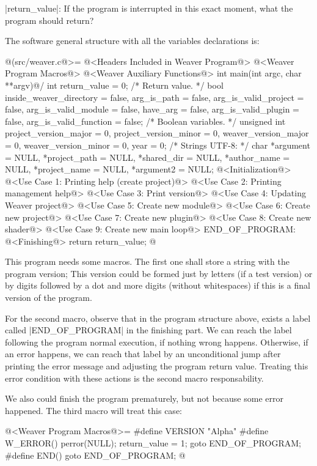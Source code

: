 |return_value|: If the program is interrupted in this exact moment,
 what the program should return?

The software general structure with all the variables declarations is:


\iniciocodigo
@(src/weaver.c@>=
@<Headers Included in Weaver Program@>
@<Weaver Program Macros@>
@<Weaver Auxiliary Functions@>
int main(int argc, char **argv){@/
  int return_value = 0; /* Return value. */
  bool inside_weaver_directory = false, arg_is_path = false,
    arg_is_valid_project = false, arg_is_valid_module = false,
    have_arg = false, arg_is_valid_plugin = false,
    arg_is_valid_function = false; /* Boolean variables. */
  unsigned int project_version_major = 0, project_version_minor = 0,
    weaver_version_major = 0, weaver_version_minor = 0,
    year = 0;
  /* Strings UTF-8: */
  char *argument = NULL, *project_path = NULL, *shared_dir = NULL,
    *author_name = NULL, *project_name = NULL, *argument2 = NULL;
  @<Initialization@>
  @<Use Case 1: Printing help (create project)@>
  @<Use Case 2: Printing management help@>
  @<Use Case 3: Print version@>
  @<Use Case 4: Updating Weaver project@>
  @<Use Case 5: Create new module@>
  @<Use Case 6: Create new project@>
  @<Use Case 7: Create new plugin@>
  @<Use Case 8: Create new shader@>
  @<Use Case 9: Create new main loop@>
END_OF_PROGRAM:
  @<Finishing@>
  return return_value;
}
@
\fimcodigo


This program needs some macros. The first one shall store a string
with the program version; This version could be formed just by letters
(if a test version) or by digits followed by a dot and more digits
(without whitespaces) if this is a final version of the program.

For the second macro, observe that in the program structure above,
exists a label called |END_OF_PROGRAM| in the finishing part. We can
reach the label following the program normal execution, if nothing
wrong happens. Otherwise, if an error happens, we can reach that label
by an unconditional jump after printing the error message and
adjusting the program return value. Treating this error condition with
these actions is the second macro responsability.

We also could finish the program prematurely, but not because some
error happened. The third macro will treat this case:

\iniciocodigo
@<Weaver Program Macros@>=
#define VERSION "Alpha"
#define W_ERROR() {perror(NULL); return_value = 1; goto END_OF_PROGRAM;}
#define END() goto END_OF_PROGRAM;
@
\fimcodigo

